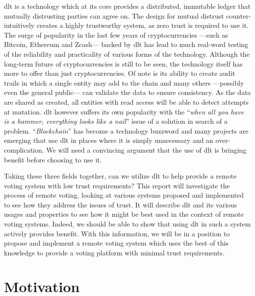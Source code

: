 \Gls{dlt} is a technology which at its core provides a distributed, immutable ledger that mutually distrusting parties can agree on. The design for mutual distrust counter-intuitively creates a highly trustworthy system, as zero trust is required to use it. The surge of popularity in the last few years of cryptocurrencies ---such as Bitcoin, Ethereum and Zcash--- backed by \gls{dlt} has lead to much real-word testing of the reliability and practicality of various forms of the technology. Although the long-term future of cryptocurrencies is still to be seen, the technology itself has more to offer than just cryptocurrencies. Of note is its ability to create audit trails in which a single entity may add to the chain and many others ---possibly even the general public--- can validate the data to ensure consistency. As the data are shared as created, all entities with read access will be able to detect attempts at mutation. \Gls{dlt} however suffers its own popularity with the ``\emph{when all you have is a hammer, everything looks like a nail}'' issue of a solution in search of a problem. ``\emph{Blockchain}'' has become a technology buzzword and many projects are emerging that use \gls{dlt} in places where it is simply unnecessary and an over-complication. We will need a convincing argument that the use of \gls{dlt} is bringing benefit before choosing to use it.

Taking these three fields together, can we utilize \gls{dlt} to help provide a remote voting system with low trust requirements? This report will investigate the process of remote voting, looking at various systems proposed and implemented to see how they address the issues of trust. It will describe \gls{dlt} and its various usages and properties to see how it might be best used in the context of remote voting systems. Indeed, we should be able to show that using \gls{dlt} in such a system actively provides benefit. With this information, we will be in a position to propose and implement a remote voting system which uses the best of this knowledge to provide a voting platform with minimal trust requirements.


\section{Motivation}
\label{ch:intro:motiv}

